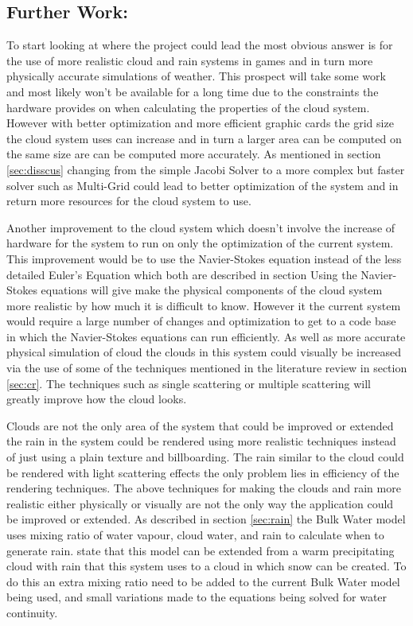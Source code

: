 \subsection{Further Work:}
\label{sec:fw}
To start looking at where the project could lead the most obvious answer is for the use of more realistic cloud and rain systems in games and in turn more physically accurate simulations of weather.
This prospect will take some work and most likely won't be available for a long time due to the constraints the hardware provides on when calculating the properties of the cloud system.
However with better optimization and more efficient graphic cards the grid size the cloud system uses can increase and in turn a larger area can be computed on the same size are can be computed more accurately.
As mentioned in section \ref{sec:disscus} changing from the simple Jacobi Solver to a more complex but faster solver such as Multi-Grid could lead to better optimization of the system and in return more resources for the cloud system to use.

Another improvement to the cloud system which doesn't involve the increase of hardware for the system to run on only the optimization of the current system.
This improvement would be to use the Navier-Stokes equation instead of the less detailed Euler's Equation which both are described in section %
Using the Navier-Stokes equations will give make the physical components of the cloud system more realistic by how much it is difficult to know.
However it the current system would require a large number of changes and optimization to get to a code base in which the Navier-Stokes equations can run efficiently. 
As well as more accurate physical simulation of cloud the clouds in this system could visually be increased via the use of some of the techniques mentioned in the literature review in section \ref{sec:cr}.
The techniques such as single scattering or multiple scattering will greatly improve how the cloud looks. 

Clouds are not the only area of the system that could be improved or extended the rain in the system could be rendered using more realistic techniques instead of just using a plain texture and billboarding.
The rain similar to the cloud could be rendered with light scattering effects the only problem lies in efficiency of the rendering techniques. 
The above techniques for making the clouds and rain more realistic either physically or visually are not the only way the application could be improved or extended.
As described in section \ref{sec:rain} the Bulk Water model uses mixing ratio of water vapour, cloud water, and rain to calculate when to generate rain.
\cite{houze1994cloud} state that this model can be extended from a warm precipitating cloud with rain that this system uses to a cloud in which snow can be created.
To do this an extra mixing ratio need to be added to the current Bulk Water model being used, and small variations made to the equations being solved for water continuity.

